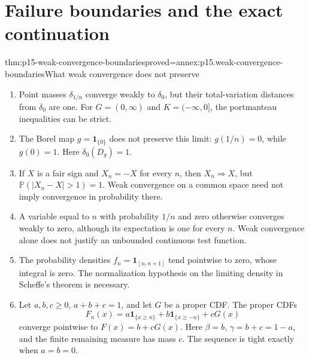 \section{Failure boundaries and the exact continuation}
\label{sec:p15-weak-failures}

\begin{hbtheorem}{thm:p15-weak-convergence-boundaries}{proved=annex:p15.weak-convergence-boundaries}{What weak convergence does not preserve}
\begin{enumerate}
\item Point masses \(\delta_{1/n}\) converge weakly to \(\delta_0\),
but their total-variation distances from \(\delta_0\) are one.
For \(G=(0,\infty)\) and \(K=(-\infty,0]\), the portmanteau
inequalities can be strict.
\item The Borel map \(g=\mathbf1_{\{0\}}\) does not preserve this
limit: \(g(1/n)=0\), while \(g(0)=1\). Here
\(\delta_0(D_g)=1\).
\item If \(X\) is a fair sign and \(X_n=-X\) for every \(n\),
then \(X_n\Rightarrow X\), but
\(\mathbb P(|X_n-X|>1)=1\). Weak convergence on a common
space need not imply convergence in probability there.
\item A variable equal to \(n\) with probability \(1/n\) and
zero otherwise converges weakly to zero, although its expectation
is one for every \(n\). Weak convergence alone does not justify
an unbounded continuous test function.
\item The probability densities
\(f_n=\mathbf1_{[n,n+1]}\) tend pointwise to zero, whose integral
is zero. The normalization hypothesis on the limiting density
in Scheffe's theorem is necessary.
\item Let \(a,b,c\geq0\), \(a+b+c=1\), and let \(G\) be a proper
CDF. The proper CDFs
\[
 F_n(x)=a\mathbf1_{\{x\geq n\}}
       +b\mathbf1_{\{x\geq-n\}}+cG(x)
\]
converge pointwise to \(F(x)=b+cG(x)\).
Here \(\beta=b\), \(\gamma=b+c=1-a\), and the finite
remaining measure has mass \(c\). The sequence is tight
exactly when \(a=b=0\).
\end{enumerate}
\end{hbtheorem}

